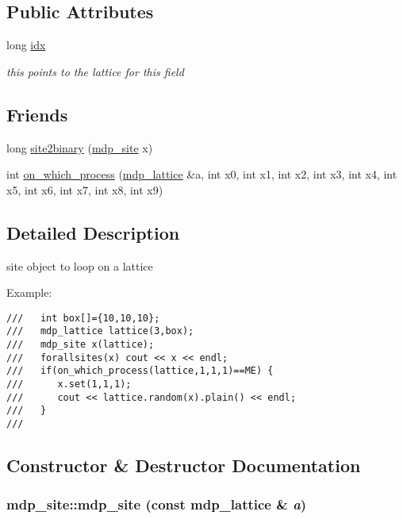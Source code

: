 \subsection*{Public Attributes}
\begin{CompactItemize}
\item 
\hypertarget{classmdp__site_3f276571a5622a41fb4ca07953a1253e}{
long \hyperlink{classmdp__site_3f276571a5622a41fb4ca07953a1253e}{idx}}
\label{classmdp__site_3f276571a5622a41fb4ca07953a1253e}

\begin{CompactList}\small\item\em this points to the lattice for this field \item\end{CompactList}\end{CompactItemize}
\subsection*{Friends}
\begin{CompactItemize}
\item 
long \hyperlink{classmdp__site_67b8c8b4e357e454748fefb8d136ac0e}{site2binary} (\hyperlink{classmdp__site}{mdp\_\-site} x)
\item 
int \hyperlink{classmdp__site_c96405ecdb78dc33d55edea04876a931}{on\_\-which\_\-process} (\hyperlink{classmdp__lattice}{mdp\_\-lattice} \&a, int x0, int x1, int x2, int x3, int x4, int x5, int x6, int x7, int x8, int x9)
\end{CompactItemize}


\subsection{Detailed Description}
site object to loop on a lattice 

Example: 

\footnotesize\begin{verbatim}
///   int box[]={10,10,10};
///   mdp_lattice lattice(3,box);
///   mdp_site x(lattice);
///   forallsites(x) cout << x << endl;
///   if(on_which_process(lattice,1,1,1)==ME) {
///      x.set(1,1,1);
///      cout << lattice.random(x).plain() << endl;
///   }
/// \end{verbatim}
\normalsize
 

\subsection{Constructor \& Destructor Documentation}
\hypertarget{classmdp__site_b61e8e96573d58449ee28b9505ca799b}{
\subsubsection[{mdp\_\-site}]{\setlength{\rightskip}{0pt plus 5cm}mdp\_\-site::mdp\_\-site (const {\bf mdp\_\-lattice} \& {\em a})}}
\label{classmdp__site_b61e8e96573d58449ee28b9505ca799b}


